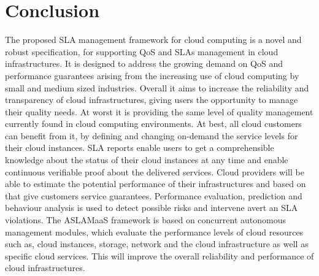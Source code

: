 \section{Conclusion}
The proposed SLA management framework for cloud computing is a novel and robust specification, for supporting QoS and SLAs management in cloud infrastructures. It is designed to address the growing demand on QoS and performance guarantees arising from the increasing use of cloud computing by small and medium sized industries. Overall it aims to increase the reliability and transparency of cloud infrastructures, giving users the opportunity to manage their quality needs. At worst it is providing the same level of quality management currently found in cloud computing environments. At best, all cloud customers can benefit from it, by defining and changing on-demand the service levels for their cloud instances. SLA reports enable users to get a comprehensible knowledge about the status of their cloud instances at any time and enable continuous verifiable proof about the delivered services. Cloud providers will be able to estimate the potential performance of their infrastructures and based on that give customers service guarantees. Performance evaluation, prediction and behaviour analysis is used to detect possible risks and intervene avert an SLA violations. The ASLAMaaS framework is based on concurrent autonomous management modules, which  evaluate the performance levels of cloud resources such as, cloud instances, storage, network and the cloud infrastructure as well as specific cloud services. This will improve the overall reliability and performance of cloud infrastructures.